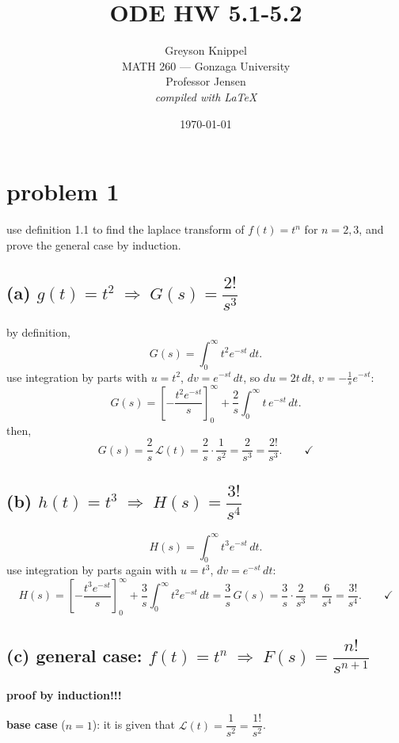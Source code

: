 \documentclass[12pt]{article}
\title{ODE HW 5.1-5.2}
\author{
Greyson Knippel \\[4pt]
MATH 260 --- Gonzaga University \\[4pt]
Professor Jensen \\[4pt]
\textit{compiled with \LaTeX}
}
\date{\today}
\begin{document}
\maketitle

\section*{problem 1}

use definition 1.1 to find the laplace transform of $f(t) = t^n$ for $n = 2, 3$, and
prove the general case by induction.

\bigskip

\subsection*{(a) $g(t) = t^2 \;\Longrightarrow\; G(s) = \dfrac{2!}{s^3}$}

by definition,
\[
  G(s) = \int_0^{\infty} t^2 e^{-st}\, dt.
\]
use integration by parts with $u = t^2$, $dv = e^{-st}\,dt$, so $du = 2t\,dt$,
$v = -\tfrac{1}{s}e^{-st}$:
\[
  G(s)
  = \left[-\frac{t^2 e^{-st}}{s}\right]_0^{\infty}
    + \frac{2}{s}\int_0^{\infty} t\, e^{-st}\, dt.
\]
then,
\[
  G(s) = \frac{2}{s}\,\mathcal{L}(t)
        = \frac{2}{s} \cdot \frac{1}{s^2}
        = \frac{2}{s^3}
        = \frac{2!}{s^3}. \qquad \checkmark
\]

\subsection*{(b) $h(t) = t^3 \;\Longrightarrow\; H(s) = \dfrac{3!}{s^4}$}

\[
  H(s) = \int_0^{\infty} t^3 e^{-st}\, dt.
\]
use integration by parts again with $u = t^3$, $dv = e^{-st}\,dt$:
\[
  H(s)
  = \left[-\frac{t^3 e^{-st}}{s}\right]_0^{\infty}
    + \frac{3}{s}\int_0^{\infty} t^2 e^{-st}\, dt
  = \frac{3}{s}\,G(s)
  = \frac{3}{s} \cdot \frac{2}{s^3}
  = \frac{6}{s^4}
  = \frac{3!}{s^4}. \qquad \checkmark
\]

\subsection*{(c) general case: $f(t) = t^n \;\Longrightarrow\; F(s) = \dfrac{n!}{s^{n+1}}$}

\textbf{proof by induction!!!}

\medskip
\textbf{base case} ($n = 1$): it is given that $\mathcal{L}(t) = \dfrac{1}{s^2} = \dfrac{1!}{s^2}$. \checkmark
\end{document}
